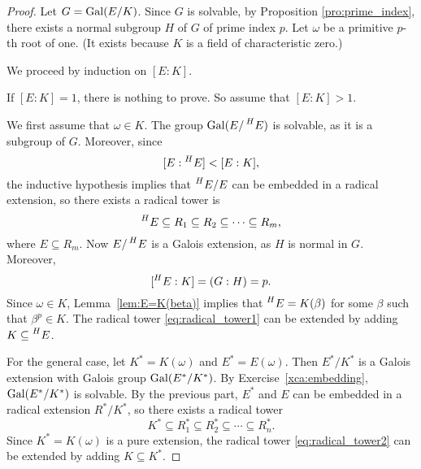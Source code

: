 \begin{proof}
    Let $G=\operatorname{Gal}(E/K)$. Since $G$ is solvable, by Proposition \ref{pro:prime_index}, 
    there exists a normal subgroup $H$ of $G$ of prime index $p$. 
    Let $\omega$ be a primitive $p$-th root of one. (It exists because $K$ is a field of characteristic zero.)
    
    We proceed by induction on $[E:K]$. 
    
    If $[E:K]=1$, there is nothing to prove. 
    So assume that $[E:K]>1$. 

    We first assume that $\omega\in K$. 
    The group $\operatorname{Gal}(E/\prescript{H}{}{E})$ is solvable, as it is a subgroup of $G$. Moreover, since 
    \[
    [E:\prescript{H}{}{E}]<[E:K],
    \]
    the inductive hypothesis implies that $\prescript{H}{}{E}/E$ can be embedded in a radical extension, so 
    there exists a radical tower
    is 
    \begin{equation}
    \label{eq:radical_tower1}
    \prescript{H}{}{E}\subseteq R_1\subseteq R_2\subseteq\cdots\subseteq R_m,
    \end{equation}
    where $E\subseteq R_m$. Now $E/\prescript{H}{}{E}$ is a Galois extension, as $H$ is normal in $G$. Moreover, 
    \[ 
    [\prescript{H}{}{E}:K]=(G:H)=p.
    \]
    Since $\omega\in K$, Lemma~\ref{lem:E=K(beta)} implies that 
    $\prescript{H}{}{E}=K(\beta)$ for some $\beta$ such that $\beta^p\in K$. The radical tower \ref{eq:radical_tower1} can be 
    extended by adding $K\subseteq \prescript{H}{}{E}$. 

    For the general case, let $K^*=K(\omega)$ and $E^*=E(\omega)$. Then $E^*/K^*$ is a Galois extension with Galois group 
    $\operatorname{Gal}(E^*/K^*)$. By Exercise~\ref{xca:embedding}, $\operatorname{Gal}(E^*/K^*)$ is solvable. By the previous part, 
    $E^*$ and $E$ can be embedded in a radical extension $R^*/K^*$, so there exists a radical tower
    \begin{equation}
    \label{eq:radical_tower2}
    K^*\subseteq R_1^*\subseteq R_2^*\subseteq\cdots\subseteq R_n^*.
    \end{equation}
    Since $K^*=K(\omega)$ is a pure extension, the radical tower \eqref{eq:radical_tower2} 
    can be extended by adding $K\subseteq K^*$. 
\end{proof}